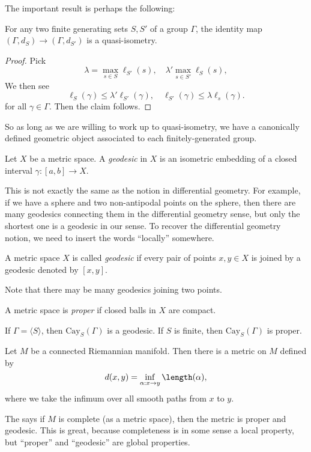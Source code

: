 \documentclass[a4paper]{article}
\newcommand\Cay{\mathrm{Cay}}
\begin{document}
The important result is perhaps the following:
\begin{thm}
  For any two finite generating sets $S, S'$ of a group $\Gamma$, the identity map $(\Gamma, d_S) \to (\Gamma, d_{S'})$ is a quasi-isometry.
\end{thm}

\begin{proof}
  Pick
  \[
    \lambda = \max_{s \in S} \ell_{S'}(s),\quad \lambda' \max_{s \in S'} \ell_{S}(s),
  \]
  We then see
  \[
    \ell_S(\gamma) \leq \lambda' \ell_{S'}(\gamma), \quad \ell_{S'}(\gamma) \leq \lambda \ell_s(\gamma). %
  \]
  for all $\gamma \in \Gamma$. Then the claim follows.
\end{proof}
So as long as we are willing to work up to quasi-isometry, we have a canonically defined geometric object associated to each finitely-generated group.

\begin{defi}[Geodesic]
  Let $X$ be a metric space. A \emph{geodesic} in $X$ is an isometric embedding of a closed interval $\gamma: [a, b] \to X$.
\end{defi}
This is not exactly the same as the notion in differential geometry. For example, if we have a sphere and two non-antipodal points on the sphere, then there are many geodesics connecting them in the differential geometry sense, but only the shortest one is a geodesic in our sense. To recover the differential geometry notion, we need to insert the words ``locally'' somewhere.

\begin{defi}
  A metric space $X$ is called \emph{geodesic} if every pair of points $x, y \in X$ is joined by a geodesic denoted by $[x, y]$.
\end{defi}
Note that there may be many geodesics joining two points.

\begin{defi}
  A metric space is \emph{proper} if closed balls in $X$ are compact.
\end{defi}

\begin{eg}
  If $\Gamma = \langle S\rangle$, then $\Cay_S(\Gamma)$ is a geodesic. If $S$ is finite, then $\Cay_S(\Gamma)$ is proper.
\end{eg}

\begin{eg}
  Let $M$ be a connected Riemannian manifold. Then there is a metric on $M$ defined by
  \[
    d(x, y) = \inf_{\alpha: x \to y} \length(\alpha),
  \]
  where we take the infimum over all smooth paths from $x$ to $y$.

  The  says if $M$ is complete (as a metric space), then the metric is proper and geodesic. This is great, because completeness is in some sense a local property, but ``proper'' and ``geodesic'' are global properties.
\end{eg}
\end{document}
